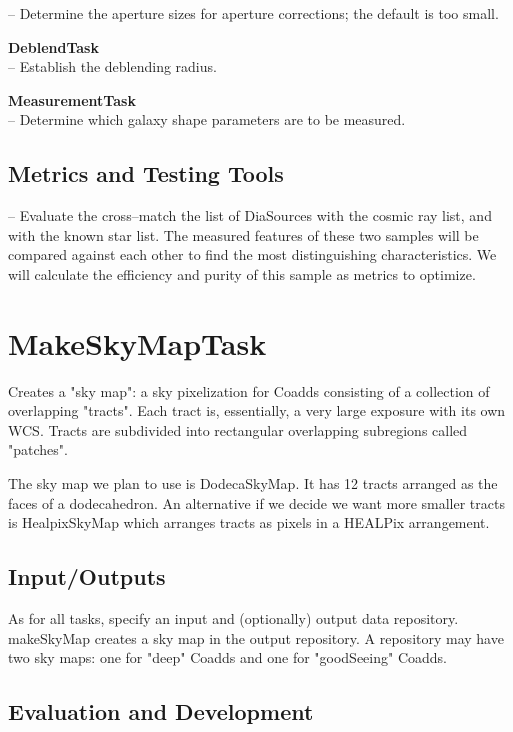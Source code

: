 \documentclass[12pt]{article}
\begin{document}
-- Determine the aperture sizes for aperture corrections; the default is too small.

{\bf DeblendTask}\\
-- Establish the deblending radius.

{\bf MeasurementTask}\\
-- Determine which galaxy shape parameters are to be measured.

\subsection{Metrics and Testing Tools}

-- Evaluate the cross--match the list of DiaSources  with the cosmic ray list, and
with the known star list.  The measured features of these two samples
will be compared against each other to find the most distinguishing
characteristics.  We will calculate the efficiency and purity of this
sample as metrics to optimize.


\section{MakeSkyMapTask} 

Creates a "sky map": a sky pixelization for Coadds consisting of a collection of overlapping "tracts".
Each tract is, essentially, a very large exposure with its own WCS.
Tracts are subdivided into rectangular overlapping subregions called "patches".

The sky map we plan to use is DodecaSkyMap. It has 12 tracts arranged as the faces of a dodecahedron.
An alternative if we decide we want more smaller tracts is HealpixSkyMap which arranges
tracts as pixels in a HEALPix arrangement.

\subsection{Input/Outputs}

As for all tasks, specify an input and (optionally) output data repository.
makeSkyMap creates a sky map in the output repository.
A repository may have two sky maps: one for "deep" Coadds and one for "goodSeeing" Coadds.

\subsection{Evaluation and Development}
\end{document}
